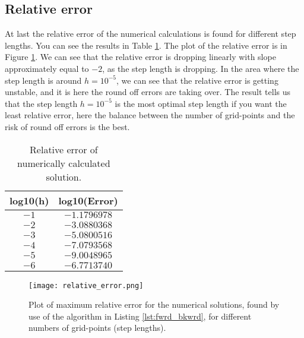 \documentclass[12pt]{article}
\begin{document}
\begin{flushleft}
\subsection*{Relative error}
At last the relative error of the numerical calculations is found for different step lengths. You can see the results in Table \ref{tab:rel_error}. The plot of the relative error is in Figure \ref{fig:rel_error}. We can see that the relative error is dropping linearly with slope approximately equal to $-2$, as the step length is dropping. In the area where the step length is around $h = 10^{-5}$, we can see that the relative error is getting unstable, and it is here the round off errors are taking over. The result tells us that the step length $h=10^{-5}$ is the most optimal step length if you want the least relative error, here the balance between the number of grid-points and the risk of round off errors is the best. 
\begin{table}[!h]
\begin{center}
\begin{tabular}{| c | c |}
	\hline		
  \textbf{log10(h)} & \textbf{log10(Error)} \\
  \hline	
  $-1$ & $-1.1796978$ \\
  $-2$ & $-3.0880368$\\
  $-3$ & $-5.0800516$\\
  $-4$ & $-7.0793568$\\
  $-5$ & $-9.0048965$\\
  $-6$ & $-6.7713740$\\
  \hline
\end{tabular}
\end{center}
\caption{\label{tab:rel_error}Relative error of numerically calculated solution.}
\end{table}
\begin{center}
\begin{figure}[!h]
\texttt{[image: relative\_error.png]}
\caption{\label{fig:rel_error}Plot of maximum relative error for the numerical solutions, found by use of the algorithm in Listing \ref{lst:fwrd_bkwrd}, for different numbers of grid-points (step lengths).}
\end{figure}
\end{center}
\end{flushleft}
\end{document}
